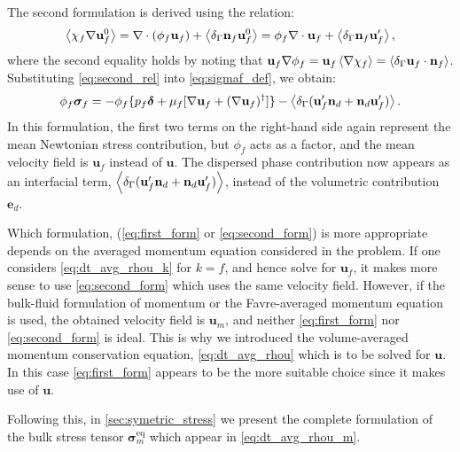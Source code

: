 The second formulation is derived using the relation: 
\begin{equation}
    \avg{\chi_f \grad \textbf{u}_f^0}
    = 
    \div (\phi_f \textbf{u}_f)
    + \avg{\delta_\Gamma \textbf{n}_f \textbf{u}_f^0}
    = 
    \phi_f \div  \textbf{u}_f
    + \avg{\delta_\Gamma \textbf{n}_f \textbf{u}_f'},
    \label{eq:second_rel}
\end{equation}
where the second equality holds by noting that $\textbf{u}_f \mathbf{\nabla} \phi_f =\textbf{u}_f \left<\mathbf{\nabla} \chi_f\right> =\left<\delta_\Gamma \textbf{u}_f \cdot \textbf{n}_f\right>$. 
Substituting \eqref{eq:second_rel} into \eqref{eq:sigmaf_def}, we obtain: 
\begin{equation}
    \phi_f\bm\sigma_f
    = 
    -\phi_f \{
        p_f \bm\delta 
        + \mu_f [\grad \textbf{u}_f + (\grad \textbf{u}_f)^\dagger] 
    \}
    - \avg{\delta_\Gamma (\textbf{u}_f'\textbf{n}_d + \textbf{n}_d \textbf{u}_f')}. 
    \label{eq:second_form}
\end{equation}
In this formulation, the first two terms on the right-hand side again represent the mean Newtonian stress contribution, but $\phi_f$ acts as a factor, and the mean velocity field is $\textbf{u}_f$ instead of $\textbf{u}$. 
The dispersed phase contribution now appears as an interfacial term, $\left<\delta_\Gamma (\textbf{u}_f'\textbf{n}_d + \textbf{n}_d \textbf{u}_f')\right>$, instead of the volumetric contribution $\textbf{e}_d$. 

Which formulation, (\ref{eq:first_form} or \ref{eq:second_form}) is more appropriate depends on the averaged momentum equation considered in the problem.  
If one considers \ref{eq:dt_avg_rhou_k} for $k=f$, and hence solve for $\textbf{u}_f$, it makes more sense to use \ref{eq:second_form} which uses the same velocity field.
However, if the bulk-fluid formulation of momentum or the Favre-averaged momentum equation is used, the obtained velocity field is $\textbf{u}_m$, and neither \ref{eq:first_form} nor \ref{eq:second_form} is ideal. 
This is why we introduced the volume-averaged momentum conservation equation, \eqref{eq:dt_avg_rhou} which is to be solved for $\textbf{u}$. 
In this case \ref{eq:first_form} appears to be the more suitable choice since it makes use of $\textbf{u}$. 


Following this, in \ref{sec:symetric_stress} we present the complete formulation of the bulk stress tensor $\bm\sigma_m^\text{eq}$ which appear in \ref{eq:dt_avg_rhou_m}. 
